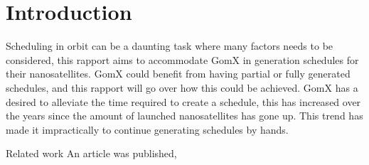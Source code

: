 \chapter{Introduction}\label{cha:intro}
Scheduling in orbit can be a daunting task where many factors needs to be considered, this rapport aims to accommodate GomX in generation schedules for their nanosatellites. GomX could benefit from having partial or fully generated schedules, and this rapport will go over how this could be achieved. GomX has a desired to alleviate the time required to create a schedule, this has increased over the years since the amount of launched nanosatellites has gone up. This trend has made it impractically to continue generating schedules by hands.


Related work
An article was published, 